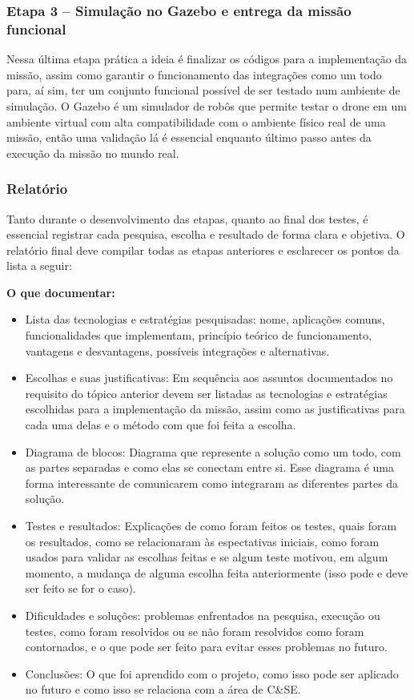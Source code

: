\subsubsection*{Etapa 3 – Simulação no Gazebo e entrega da missão funcional}

Nessa última etapa prática a ideia é finalizar os códigos para a implementação da missão, assim como garantir o funcionamento das integrações como um todo para, aí sim, ter um conjunto funcional possível de ser testado num ambiente de simulação. O Gazebo é um simulador de robôs que permite testar o drone em um ambiente virtual com alta compatibilidade com o ambiente físico real de uma missão, então uma validação lá é essencial enquanto último passo antes da execução da missão no mundo real. 


\subsubsection*{Relatório}

Tanto durante o desenvolvimento das etapas, quanto ao final dos testes, é essencial registrar cada pesquisa, escolha e resultado de forma clara e objetiva. O relatório final deve compilar todas as etapas anteriores e esclarecer os pontos da lista a seguir:

\textbf{O que documentar:}
\begin{itemize}
    \item Lista das tecnologias e estratégias pesquisadas: nome, aplicações comuns, funcionalidades que implementam, princípio teórico de funcionamento, vantagens e desvantagens, possíveis integrações e alternativas.
    \item Escolhas e suas justificativas: Em sequência aos assuntos documentados no requisito do tópico anterior devem ser listadas as tecnologias e estratégias escolhidas para a implementação da missão, assim como as justificativas para cada uma delas e o método com que foi feita a escolha.
    \item Diagrama de blocos: Diagrama que represente a solução como um todo, com as partes separadas e como elas se conectam entre si. Esse diagrama é uma forma interessante de comunicarem como integraram as diferentes partes da solução.
    \item Testes e resultados: Explicações de como foram feitos os testes, quais foram os resultados, como se relacionaram às espectativas iniciais, como foram usados para validar as escolhas feitas e se algum teste motivou, em algum momento, a mudança de alguma escolha feita anteriormente (isso pode e deve ser feito se for o caso).
    \item Dificuldades e soluções: problemas enfrentados na pesquisa, execução ou testes, como foram resolvidos ou se não foram resolvidos como foram contornados, e o que pode ser feito para evitar esses problemas no futuro.
    \item Conclusões: O que foi aprendido com o projeto, como isso pode ser aplicado no futuro e como isso se relaciona com a área de C\&SE.
\end{itemize}




